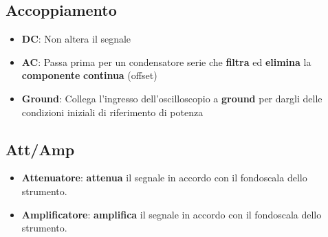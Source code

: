 \subsection{Accoppiamento}
\begin{itemize}
    \item \textbf{DC}: Non altera il segnale
    \item \textbf{AC}: Passa prima per un condensatore serie che \textbf{filtra} ed \textbf{elimina} la \textbf{componente} \textbf{continua} (offset)
    \item \textbf{Ground}: Collega l'ingresso dell'oscilloscopio a \textbf{ground} per dargli delle condizioni iniziali di riferimento di potenza
\end{itemize}
\subsection{Att/Amp}
\begin{itemize}
    \item \textbf{Attenuatore}: \textbf{attenua} il segnale in accordo con il fondoscala dello strumento.
    \item \textbf{Amplificatore}: \textbf{amplifica} il segnale in accordo con il fondoscala dello strumento.
\end{itemize}
